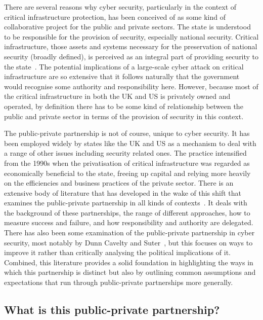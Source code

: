 \documentclass[a4paper,11pt]{article}
\begin{document}
There are several reasons why cyber security, particularly in the
context of critical infrastructure protection, has been conceived of
as some kind of collaborative project for the public and private
sectors. The state is understood to be responsible for the provision
of security, especially national security. Critical infrastructure,
those assets and systems necessary for the preservation of national
security (broadly defined), is perceived as an integral part of
providing security to the state~\cite{choucri-et-al:2014}. The
potential implications of a large-scale cyber attack on critical
infrastructure are so extensive that it follows naturally that the
government would recognise some authority and responsibility
here. However, because most of the critical infrastructure in both the
UK and US is privately owned and operated, by definition there has to
be some kind of relationship between the public and private sector in
terms of the provision of security in this context.

The public-private partnership is not of course, unique to cyber
security. It has been employed widely by states like the UK and US as
a mechanism to deal with a range of other issues including security
related ones. The practice intensified from the 1990s when the
privatisation of critical infrastructure was regarded as economically
beneficial to the state, freeing up capital and relying more heavily
on the efficiencies and business practices of the private
sector. There is an extensive body of literature that has developed in
the wake of this shift that examines the public-private partnership in
all kinds of
contexts~\cite{osborne:2007,devries+yehoue:2013,mazzucato:2013}. It
deals with the background of these partnerships, the range of
different approaches, how to measure success and failure, and how
responsibility and authority are delegated. There has also been some
examination of the public-private partnership in cyber security, most
notably by Dunn Cavelty and Suter~\cite{dunncavelty+suter:2009}, but
this focuses on ways to improve it rather than critically analysing
the political implications of it. Combined, this literature provides a
solid foundation in highlighting the ways in which this partnership is
distinct but also by outlining common assumptions and expectations
that run through public-private partnerships more generally.

\subsection{What is this public-private partnership?}
\end{document}
